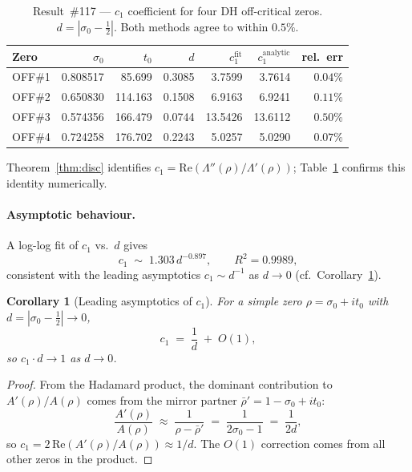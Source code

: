 \documentclass[11pt, a4paper]{article}
\theoremstyle{plain}
\newtheorem{corollary}[theorem]{Corollary}
\theoremstyle{definition}
\begin{document}
\begin{table}[ht]
\centering
\caption{Result~\#117 — $c_{1}$ coefficient for four DH off-critical zeros.
  $d=|\sigma_{0}-\tfrac{1}{2}|$.  Both methods agree to within $0.5\%$.}
\label{tab:c1117}
\small
\begin{tabular}{lrrrrrr}
\toprule
Zero & $\sigma_{0}$ & $t_{0}$ & $d$ & $c_{1}^{\text{fit}}$
     & $c_{1}^{\text{analytic}}$ & rel.\ err \\
\midrule
OFF\#1 & 0.808517 & 85.699  & 0.3085 & 3.7599 & 3.7614 & $0.04\%$ \\
OFF\#2 & 0.650830 & 114.163 & 0.1508 & 6.9163 & 6.9241 & $0.11\%$ \\
OFF\#3 & 0.574356 & 166.479 & 0.0744 & 13.5426 & 13.6112 & $0.50\%$ \\
OFF\#4 & 0.724258 & 176.702 & 0.2243 & 5.0257 & 5.0290 & $0.07\%$ \\
\bottomrule
\end{tabular}
\end{table}

Theorem~\ref{thm:disc} identifies $c_{1}=\mathrm{Re}(\Lambda''(\rho)/\Lambda'(\rho))$;
Table~\ref{tab:c1117} confirms this identity numerically.

\paragraph{Asymptotic behaviour.}
A log-log fit of $c_{1}$ vs.\ $d$ gives
\[
  c_{1} \;\sim\; 1.303\,d^{-0.897}, \qquad R^{2}=0.9989,
\]
consistent with the leading asymptotics $c_{1}\sim d^{-1}$ as $d\to 0$
(cf.\ Corollary~\ref{cor:asym}).

\begin{corollary}[Leading asymptotics of $c_{1}$]
\label{cor:asym}
  For a simple zero $\rho=\sigma_{0}+it_{0}$ with $d=|\sigma_{0}-\tfrac{1}{2}|
  \to 0$,
  \[
    c_{1} \;=\; \frac{1}{d} \;+\; O(1),
  \]
  so $c_{1}\cdot d \to 1$ as $d\to 0$.
\end{corollary}

\begin{proof}
  From the Hadamard product, the dominant contribution to
  $A'(\rho)/A(\rho)$ comes from the mirror partner $\bar\rho' = 1-\sigma_{0}+it_{0}$:
  \[
    \frac{A'(\rho)}{A(\rho)} \;\approx\; \frac{1}{\rho-\bar\rho'}
    \;=\; \frac{1}{2\sigma_{0}-1} \;=\; \frac{1}{2d},
  \]
  so $c_{1}=2\,\mathrm{Re}(A'(\rho)/A(\rho))\approx 1/d$.
  The $O(1)$ correction comes from all other zeros in the product.
\end{proof}
\end{document}
